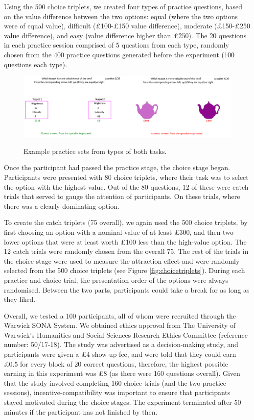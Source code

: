 \documentclass[11pt,a4paper]{article}
\begin{document}
Using the 500 choice triplets, we created four types of practice questions, based on the value difference between the two options: equal (where the two options were of equal value), difficult (£100-£150 value difference), moderate (£150-£250 value difference), and easy (value difference higher than £250). The 20 questions in each practice session comprised of 5 questions from each type, randomly chosen from the 400 practice questions generated before the experiment (100 questions each type).


\begin{figure}
\centering
\caption{Example practice sets from types of both tasks.}
\includegraphics[width=1\textwidth]{practice.png}
\label{fig:practice}
\end{figure}


Once the participant had passed the practice stage, the choice stage began. Participants were presented with 80 choice triplets, where their task was to select the option with the highest value. Out of the 80 questions, 12 of these were catch trials that served to gauge the attention of participants. On these trials, where there was a clearly dominating option. 

To create the catch triplets (75 overall), we again used the 500 choice triplets, by first choosing an option with a nominal value of at least £300, and then two lower options that were at least worth £100 less than the high-value option. The 12 catch trials were randomly chosen from the overall 75. The rest of the trials in the choice stage were used to measure the attraction effect and were randomly selected from the 500 choice triplets (see Figure \ref{fig:choicetriplets}). During each practice and choice trial, the presentation order of the options were always randomised. Between the two parts, participants could take a break for as long as they liked.


Overall, we tested a 100 participants, all of whom were recruited through the Warwick SONA System.  We obtained ethics approval from The University of Warwick’s Humanities and Social Sciences Research Ethics Committee (reference number: 50/17-18). The study was advertised as a decision-making study, and participants were given a £4 show-up fee, and were told that they could earn £0.5 for every block of 20 correct questions, therefore, the highest possible earning in this experiment was £8 (as there were 160 questions overall). Given that the study involved completing 160 choice trials (and the two practice sessions), incentive-compatibility was important to ensure that participants stayed motivated during the choice stages. The experiment terminated after 50 minutes if the participant has not finished by then. 
\end{document}
